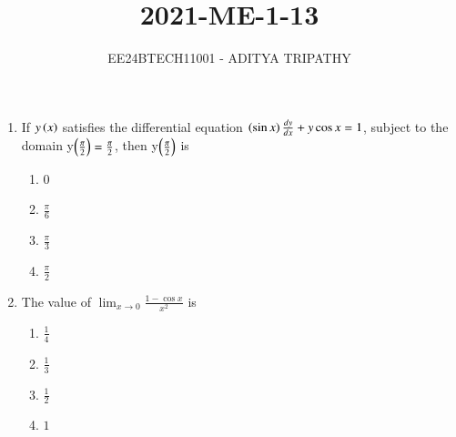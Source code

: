 \documentclass[journal,12pt,onecolumn]{IEEEtran}
\theoremstyle{remark}
\begin{document}

\vspace{3cm}

\title{2021-ME-1-13}
\author{EE24BTECH11001 -  ADITYA TRIPATHY}
\maketitle

\renewcommand{\thefigure}{\theenumi}
\renewcommand{\thetable}{\theenumi}

\begin{enumerate}
    \item 
        If $y\left(x\right)$ satisfies the differential equation $\left(\sin x\right)\frac{dy}{dx} + y\cos x = 1$,
        subject to the domain y$\left(\frac{\pi}{2}\right) = \frac{\pi}{2}$, then y$\left(\frac{\pi}{2}\right)$
        is 
        \hfill{}
        \begin{multicols}{4}
            \begin{enumerate}
                \item 0
                    \columnbreak
                \item $\frac{\pi}{6}$
                    \columnbreak
                \item $\frac{\pi}{3}$
                    \columnbreak
                \item $\frac{\pi}{2}$
            \end{enumerate}
        \end{multicols}
    \item The value of $\lim_{x \rightarrow 0} \frac{1 - \cos x}{x^2}$ is
        \hfill{}
        \begin{multicols}{4}
            \begin{enumerate}
                \item $\frac{1}{4}$
                    \columnbreak
                \item $\frac{1}{3}$
                    \columnbreak
                \item $\frac{1}{2}$
                    \columnbreak
                \item $1$
            \end{enumerate}
        \end{multicols}


\end{enumerate}
\end{document}
